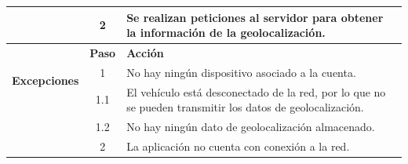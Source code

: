 \begin{table}[H]
\begin{tabularx}{\textwidth}{|c|c|X|}
    \cline{2-3}
                                                & 2                                                                                                                                                                                           & \multicolumn{1}{L|}{Se realizan peticiones al servidor para obtener la información de la geolocalización.}                                                        \\
    \hline
    \multirow{3}{*}{\textbf{Excepciones}}       & \textbf{Paso}                                                                                                                                                                               & \textbf{Acción}                                                                                                                                                   \\
    \cline{2-3}
                                                & 1                                                                                                                                                                                           & \multicolumn{1}{L|}{No hay ningún dispositivo asociado a la cuenta.}                                                                                              \\
    \cline{2-3}
                                                & 1.1                                                                                                                                                                                         & \multicolumn{1}{L|}{El vehículo está desconectado de la red, por lo que no se pueden transmitir los datos de geolocalización.}                                    \\
    \cline{2-3}
                                                & 1.2                                                                                                                                                                                         & \multicolumn{1}{L|}{No hay ningún dato de geolocalización almacenado.}                                                                                            \\
    \cline{2-3}
                                                & 2                                                                                                                                                                                           & \multicolumn{1}{L|}{La aplicación no cuenta con conexión a la red.}                                                                                               \\
    \hline
  \end{tabularx}
\end{table}


